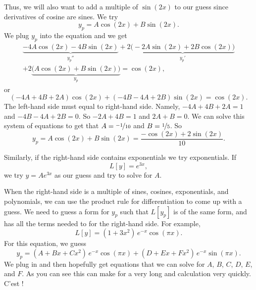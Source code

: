 \documentclass{ximera}
\begin{document}
\begin{exampleSol}
    Thus, we will also want to add a multiple of $\sin (2x)$ to our guess since derivatives of cosine are sines.  We try
    \begin{equation*}
        y_p = A \cos (2x) + B \sin (2x) .
    \end{equation*}
    We plug $y_p$ into the equation and we get
    \begin{multline*}
        \underbrace{-4 A \cos (2x) - 4 B \sin (2x)}_{y_p''} +2 \underbrace{\bigl(-2A \sin (2x) + 2B \cos (2x)\bigr)}_{y_p'} \\
        + 2 \underbrace{\bigl(A \cos (2x) + B \sin (2x)\bigr)}_{y_p} = \cos (2x) ,
    \end{multline*}
    or
    \begin{equation*}
        (-4A+4B+2A) \cos(2x) + (-4B-4A+2B) \sin(2x) = \cos(2x) .
    \end{equation*}
    The left-hand side must equal to right-hand side.  Namely, $-4A + 4B + 2A = 1$ and $-4B - 4A + 2B = 0$.  So $-2A+4B =1$ and $2A+B=0$. We can solve this system of equations to get that $A=\nicefrac{-1}{10}$ and $B=\nicefrac{1}{5}$.  So
    \begin{equation*}
        y_p = A \cos (2x) + B \sin (2x) = \frac{-\cos (2x) + 2 \sin (2x)}{10} .
    \end{equation*}
\end{exampleSol}

Similarly, if the right-hand side contains exponentials we try exponentials. If
\begin{equation*}
    L[y] = e^{3x},
\end{equation*}
we try $y = A e^{3x}$ as our guess and try to solve for $A$.

When the right-hand side is a multiple of sines, cosines, exponentials, and polynomials, we can use the product rule for differentiation to come up with a guess.  We need to guess a form for $y_p$ such that $L[y_p]$ is of the same form, and has all the terms needed to for  the right-hand side. For example,
\begin{equation*}
    L[y] = (1+3x^2)\,e^{-x}\cos (\pi x) .
\end{equation*}
For this equation, we guess
\begin{equation*}
    y_p = (A + Bx + Cx^2)\,e^{-x} \cos (\pi x) + (D + Ex + Fx^2)\,e^{-x} \sin (\pi x) .
\end{equation*}
We plug in and then hopefully get equations that we can solve for $A$, $B$, $C$, $D$, $E$, and $F$.
As you can see this can make for a very long and  %
calculation very quickly.  C'est ! %
\end{document}
